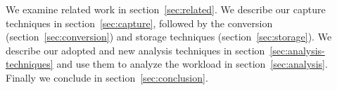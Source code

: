 We examine related work in section~\ref{sec:related}.  We describe our
capture techniques in section~\ref{sec:capture}, followed by the
conversion (section~\ref{sec:conversion}) and storage
techniques (section~\ref{sec:storage}).  We describe our adopted and
new analysis techniques in section~\ref{sec:analysis-techniques} and
use them to analyze the workload in section~\ref{sec:analysis}.
Finally we conclude in section~\ref{sec:conclusion}.
